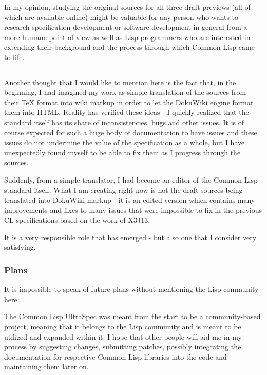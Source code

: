 In my opinion, studying the original sources for all three draft
previews (all of which are available online) might be valuable for any
person who wants to research specification development or software
development in general from a more humane point of view as well as Lisp
programmers who are interested in extending their background and the
process through which Common Lisp came to life.

\begin{center}\rule{0.5\linewidth}{\linethickness}\end{center}

Another thought that I would like to mention here is the fact that, in
the beginning, I had imagined my work as simple translation of the
sources from their TeX format into wiki markup in order to let the
DokuWiki engine format them into HTML. Reality has verified these ideas
- I quickly realized that the standard itself has its share of
inconsistencies, bugs and other issues. It is of course expected for
such a huge body of documentation to have issues and these issues do not
undermine the value of the specification as a whole, but I have
unexpectedly found myself to be able to fix them as I progress through
the sources.

Suddenly, from a simple translator, I had become an editor of the Common
Lisp standard itself. What I am creating right now is not the draft
sources being translated into DokuWiki markup - it is an edited version
which contains many improvements and fixes to many issues that were
impossible to fix in the previous CL specifications based on the work of
X3J13.

It is a very responsible role that has emerged - but also one that I
consider very satisfying.

\subsubsection{Plans}\label{plans}

It is impossible to speak of future plans without mentioning the Lisp
community here.

The Common Lisp UltraSpec was meant from the start to be a
community-based project, meaning that it belongs to the Lisp community
and is meant to be utilized and expanded within it. I hope that other
people will aid me in my process by suggesting changes, submitting
patches, possibly integrating the documentation for respective Common
Lisp libraries into the code and maintaining them later on.

